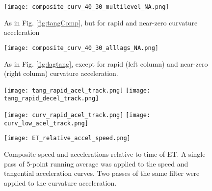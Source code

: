 \documentclass[wcd,manuscript]{copernicus}
\begin{document}
\clearpage
\begin{figure*}[t]
  \centering
    \texttt{[image: composite\_curv\_40\_30\_multilevel\_NA.png]}
  \caption{As in Fig. \ref{fig:tangComp}, but for rapid and near-zero curvature acceleration}
  \label{fig:curvComp}
\end{figure*}





\clearpage
\begin{figure*}[t]
  \centering
    \texttt{[image: composite\_curv\_40\_30\_alllags\_NA.png]}
  \caption{As in Fig. \ref{fig:lagtang}, except for rapid (left column) and near-zero (right column) curvature acceleration.}
  \label{fig:lagcurv}
\end{figure*}

\clearpage
\begin{figure*}[t]
  \centering
    \texttt{[image: tang\_rapid\_acel\_track.png]}
     \texttt{[image: tang\_rapid\_decel\_track.png]}
  \caption{}
  \label{fig:tang_track}
\end{figure*}


\clearpage

\begin{figure*}[t]
  \centering
    \texttt{[image: curv\_rapid\_acel\_track.png]}
     \texttt{[image: curv\_low\_acel\_track.png]}
  \caption{}
  \label{fig:curv_track}
\end{figure*}





\begin{figure*}[t]
  \texttt{[image: ET\_relative\_accel\_speed.png]}
  \caption{Composite speed and accelerations relative to time of ET. A single pass of 5-point running average was applied to the speed and tangential acceleration curves. Two passes of the same filter were applied to the curvature acceleration.}\label{fig:ET_SA}
\end{figure*}
\end{document}
